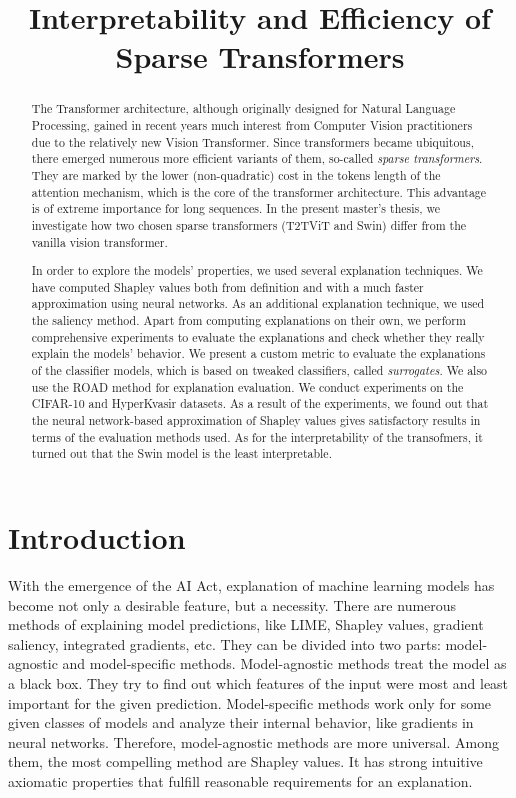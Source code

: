 \documentclass[magisterska,en]{pracamgr}
\title{Interpretability and Efficiency of Sparse Transformers}
\begin{document}
\maketitle

\begin{abstract}
The Transformer architecture, although originally designed for Natural Language Processing, gained in recent years much interest from Computer Vision practitioners due to the relatively new Vision Transformer. Since transformers became ubiquitous, there emerged numerous more efficient variants of them, so-called \emph{sparse transformers}. They are marked by the lower (non-quadratic) cost in the tokens length of the attention mechanism, which is the core of the transformer architecture. This advantage is of extreme importance for long sequences. In the present master's thesis, we investigate how two chosen sparse transformers (T2T\textunderscore ViT and Swin) differ from the vanilla vision transformer.

In order to explore the models' properties, we used several explanation techniques. We have computed Shapley values both from definition and with a much faster approximation using neural networks. As an additional explanation technique, we used the saliency method. Apart from computing explanations on their own, we perform comprehensive experiments to evaluate the explanations and check whether they really explain the models' behavior. We present a custom metric to evaluate the explanations of the classifier models, which is based on tweaked classifiers, called \emph{surrogates}. We also use the ROAD method for explanation evaluation. We conduct experiments on the CIFAR-10 and HyperKvasir datasets.
As a result of the experiments, we found out that the neural network-based approximation of Shapley values gives satisfactory results in terms of the evaluation methods used. As for the interpretability of the transofmers, it turned out that the Swin model is the least interpretable.
\end{abstract}

\tableofcontents

\chapter*{Introduction}
With the emergence of the AI Act, explanation of machine learning models has become not only a desirable feature, but a necessity. There are numerous methods of explaining model predictions, like LIME, Shapley values, gradient saliency, integrated gradients, etc. They can be divided into two parts: model-agnostic and model-specific methods. Model-agnostic methods treat the model as a black box. They try to find out which features of the input were most and least important for the given prediction. Model-specific methods work only for some given classes of models and analyze their internal behavior, like gradients in neural networks.
Therefore, model-agnostic methods are more universal. Among them, the most compelling method are Shapley values. It has strong intuitive axiomatic properties that fulfill reasonable requirements for an explanation.
\end{document}
